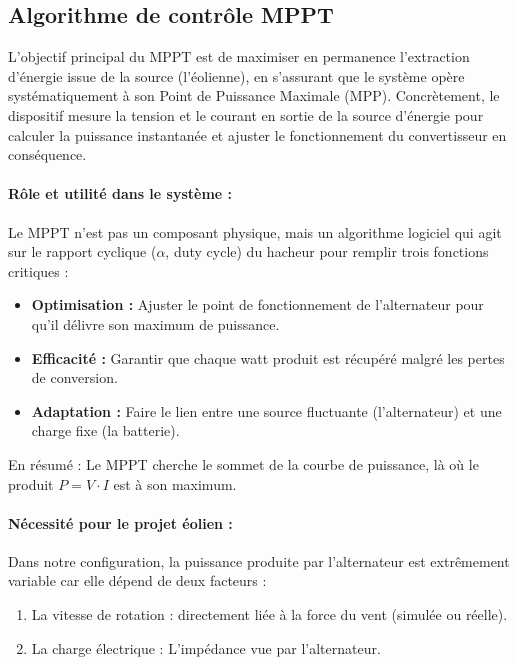         \subsection{Algorithme de contrôle MPPT}
        L'objectif principal du MPPT est de maximiser en permanence l'extraction d'énergie issue de la source (l'éolienne), en s'assurant que le système opère systématiquement à son Point de Puissance Maximale (MPP). Concrètement, le dispositif mesure la tension et le courant en sortie de la source d'énergie pour calculer la puissance instantanée et ajuster le fonctionnement du convertisseur en conséquence.

        \paragraph{Rôle et utilité dans le système :}
        Le MPPT n'est pas un composant physique, mais un algorithme logiciel qui agit sur le rapport cyclique ($\alpha$, duty cycle) du hacheur pour remplir trois fonctions critiques :
        \begin{itemize}
            \item \textbf{Optimisation :} Ajuster le point de fonctionnement de l'alternateur pour qu'il délivre son maximum de puissance.
            \item \textbf{Efficacité :} Garantir que chaque watt produit est récupéré malgré les pertes de conversion.
            \item \textbf{Adaptation :} Faire le lien entre une source fluctuante (l'alternateur) et une charge fixe (la batterie).
        \end{itemize}

        En résumé : Le MPPT cherche le sommet de la courbe de puissance, là où le produit $P=V \cdot I$ est à son maximum.

        \paragraph{Nécessité pour le projet éolien :}
        Dans notre configuration, la puissance produite par l'alternateur est extrêmement variable car elle dépend de deux facteurs :
        \begin{enumerate}
            \item La vitesse de rotation : directement liée à la force du vent (simulée ou réelle).
            \item La charge électrique : L'impédance vue par l'alternateur.
        \end{enumerate}

